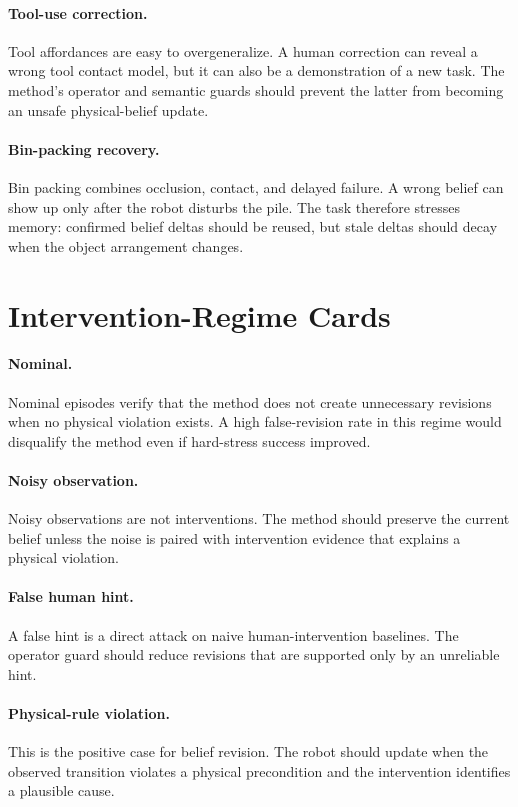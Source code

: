 \documentclass{article}
\begin{document}
\paragraph{Tool-use correction.} Tool affordances are easy to overgeneralize. A human correction can reveal a wrong tool contact model, but it can also be a demonstration of a new task. The method's operator and semantic guards should prevent the latter from becoming an unsafe physical-belief update.

\paragraph{Bin-packing recovery.} Bin packing combines occlusion, contact, and delayed failure. A wrong belief can show up only after the robot disturbs the pile. The task therefore stresses memory: confirmed belief deltas should be reused, but stale deltas should decay when the object arrangement changes.

\clearpage
\section{Intervention-Regime Cards}
\paragraph{Nominal.} Nominal episodes verify that the method does not create unnecessary revisions when no physical violation exists. A high false-revision rate in this regime would disqualify the method even if hard-stress success improved.

\paragraph{Noisy observation.} Noisy observations are not interventions. The method should preserve the current belief unless the noise is paired with intervention evidence that explains a physical violation.

\paragraph{False human hint.} A false hint is a direct attack on naive human-intervention baselines. The operator guard should reduce revisions that are supported only by an unreliable hint.

\paragraph{Physical-rule violation.} This is the positive case for belief revision. The robot should update when the observed transition violates a physical precondition and the intervention identifies a plausible cause.
\end{document}
